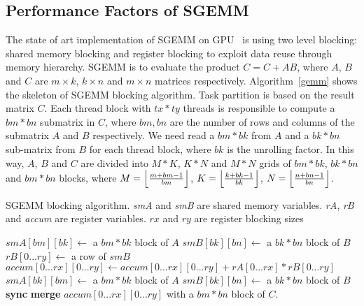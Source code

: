 \subsection{Performance Factors of SGEMM}
\label{sec:sgemm}
The state of art implementation of SGEMM on GPU~\cite{magma,nervana_sgemm_wiki,lai,tan} is using two level blocking:
shared memory blocking and register blocking to exploit data reuse through memory hierarchy.
SGEMM is to evaluate the product $C = C + AB$, where $A$, $B$ and $C$ are $m\times k$, $k\times n$ and $m\times n$
matrices respectively. 
Algorithm~\ref{gemm} shows the skeleton of SGEMM blocking algorithm. Task partition is based on the result matrix $C$. 
Each thread block with $tx*ty$ threads is responsible to compute a $bm*bn$ submatrix in $C$, where $bm, bn$ are the 
number of rows and columns of the submatrix $A$ and $B$ respectively. We need read a $bm*bk$ from $A$ and a $bk*bn$ sub-matrix from 
$B$ for each thread block, where $bk$ is the unrolling factor. In this way, $A$, $B$ and $C$ are divided into $M*K$, $K*N$ and 
$M*N$ grids of $bm*bk$, $bk*bn$ and $bm*bn$ blocks, where $M=\Bigl\lfloor \frac{m+bm-1}{bm} \Bigr\rfloor$, 
$K=\Bigl\lfloor \frac{k+bk-1}{bk} \Bigr\rfloor$, $N=\Bigl\lfloor \frac{n+bn-1}{bn} \Bigr\rfloor$.

\begin{algorithm}
  \caption{SGEMM blocking algorithm. {\em smA} and {\em smB} are shared memory variables. {\em rA}, {\em rB} and {\em 
accum} are register variables. $rx$ and $ry$ are register blocking sizes}
  \label{gemm}
  \begin{algorithmic}[1]
	\State $smA[bm][bk] \gets$ a $bm * bk$ block of $A$
	\State $smB[bk][bn] \gets$ a $bk * bn$ block of $B$
	\Do
      \State {\color {black} {$rA[0...rx]\gets$ a column of $smA$}}
	\State $rB[0...ry]\gets$ a row of $smB$
	\State $accum[0...rx][0...ry]\gets accum[0...rx][0...ry]+rA[0...rx]*rB[0...ry]$
	\EndFor
	\State $smA[bk][bm]\gets$ a $bm*bk$ block of $A$
	\State $smB[bk][bn]\gets$ a $bk*bn$ block of $B$
	\State \textbf{sync}
	\State \textbf{merge} $accum[0...rx][0...ry]$ with a $bm*bn$ block of $C$.
  \end{algorithmic}
\end{algorithm}


